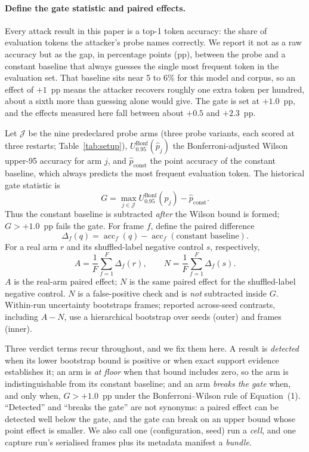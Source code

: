 \documentclass[11pt]{article}
\newcommand{\pp}{pp}
\begin{document}
\paragraph{Define the gate statistic and paired effects.}
Every attack result in this paper is a top-1 token accuracy: the share of
evaluation tokens the attacker's probe names correctly. We report it not as a
raw accuracy but as the gap, in percentage points (pp), between the probe and a
constant baseline that always guesses the single most frequent token in the
evaluation set. That baseline sits near 5 to 6\% for this model and corpus, so
an effect of $+1$~\pp{} means the attacker recovers roughly one extra token per
hundred, about a sixth more than guessing alone would give. The gate is set at
$+1.0$~\pp{}, and the effects measured here fall between about $+0.5$ and
$+2.3$~\pp{}.

Let $\mathcal J$ be the nine predeclared probe arms (three probe variants,
each scored at three restarts; Table~\ref{tab:setup}),
$U^{\mathrm{Bonf}}_{0.95}(\widehat p_j)$ the Bonferroni-adjusted Wilson upper-95
accuracy for arm $j$, and $\widehat p_{\mathrm{const}}$ the point accuracy of
the constant baseline, which always predicts the most frequent evaluation
token. The historical gate statistic is
\begin{equation}
G = \max_{j\in\mathcal J} U^{\mathrm{Bonf}}_{0.95}(\widehat p_j)
    - \widehat p_{\mathrm{const}} .
\end{equation}
Thus the constant baseline is subtracted \emph{after} the Wilson bound is
formed; $G>+1.0$~\pp{} fails the gate. For frame $f$, define the paired
difference
\begin{equation}
\Delta_f(q)=\operatorname{acc}_f(q)-
             \operatorname{acc}_f(\text{constant baseline}).
\end{equation}
For a real arm $r$ and its shuffled-label negative control $s$, respectively,
\begin{equation}
A = \frac{1}{F}\sum_{f=1}^{F}\Delta_f(r),
\qquad
N = \frac{1}{F}\sum_{f=1}^{F}\Delta_f(s).
\end{equation}
$A$ is the real-arm paired effect; $N$ is the same paired effect for the
shuffled-label negative control. $N$ is a false-positive check and is
\emph{not} subtracted inside $G$. Within-run uncertainty bootstraps frames;
reported across-seed contrasts, including $A-N$, use a hierarchical bootstrap
over seeds (outer) and frames (inner).

Three verdict terms recur throughout, and we fix them here. A result is
\emph{detected} when its lower bootstrap bound is positive or when exact
support evidence establishes it; an arm is \emph{at floor} when that bound
includes zero, so the arm is indistinguishable from its constant baseline; and
an arm \emph{breaks the gate} when, and only when, $G > +1.0$~\pp{} under the
Bonferroni--Wilson rule of Equation~(1). ``Detected'' and ``breaks the gate''
are not synonyms: a paired effect can be detected well below the gate, and the
gate can break on an upper bound whose point effect is smaller.
We also call one (configuration, seed) run a \emph{cell}, and one capture run's
serialised frames plus its metadata manifest a \emph{bundle}.
\end{document}
